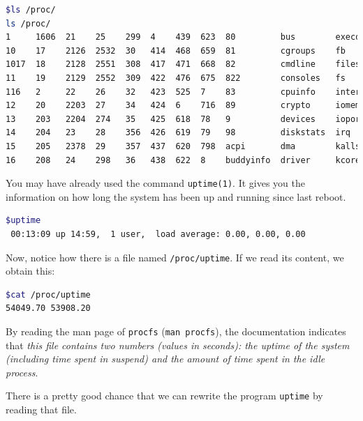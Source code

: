 \documentclass[12pt]{article}
\begin{document}
\begin{lstlisting}[language=bash]
$ls /proc/
ls /proc/
1     1606  21    25    299  4    439  623  80         bus        execdomains  key-users    misc          self           tty
10    17    2126  2532  30   414  468  659  81         cgroups    fb           keys         modules       slabinfo       uptime
1017  18    2128  2551  308  417  471  668  82         cmdline    filesystems  kmsg         mounts        softirqs       version
11    19    2129  2552  309  422  476  675  822        consoles   fs           kpagecgroup  mtrr          stat           version_signature
116   2     22    26    32   423  525  7    83         cpuinfo    interrupts   kpagecount   net           swaps          vmallocinfo
12    20    2203  27    34   424  6    716  89         crypto     iomem        kpageflags   pagetypeinfo  sys            vmstat
13    203   2204  274   35   425  618  78   9          devices    ioports      loadavg      partitions    sysrq-trigger  zoneinfo
14    204   23    28    356  426  619  79   98         diskstats  irq          locks        sched_debug   sysvipc
15    205   2378  29    357  437  620  798  acpi       dma        kallsyms     mdstat       schedstat     thread-self
16    208   24    298   36   438  622  8    buddyinfo  driver     kcore        meminfo      scsi          timer_list
\end{lstlisting}

You may have already used the command \texttt{uptime(1)}. It gives you the information on how long the system has been up and running since last reboot.

\begin{lstlisting}[language=bash]
$uptime
 00:13:09 up 14:59,  1 user,  load average: 0.00, 0.00, 0.00
\end{lstlisting}

Now, notice how there is a file named \texttt{/proc/uptime}. If we read its content, we obtain this:
\begin{lstlisting}[language=bash]
$cat /proc/uptime
54049.70 53908.20
\end{lstlisting}

By reading the man page of \texttt{procfs} (\texttt{man procfs}), the documentation indicates that \textit{this file contains two numbers (values in seconds): the uptime of the system (including time spent in suspend) and the amount of time spent in the idle process}.

There is a pretty good chance that we can rewrite the program \texttt{uptime} by reading that file.
\end{document}
